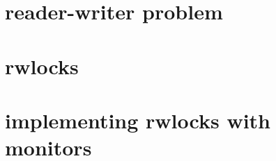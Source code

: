 \section{reader-writer problem}

\section{rwlocks}



\section{implementing rwlocks with monitors}




%
